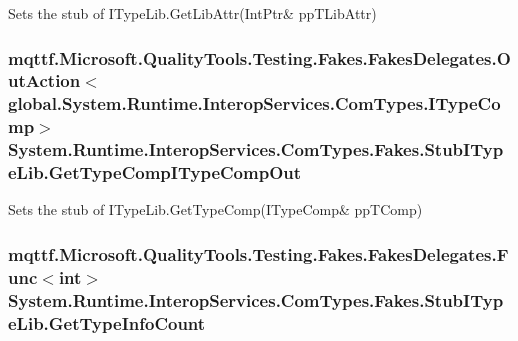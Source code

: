 Sets the stub of I\-Type\-Lib.\-Get\-Lib\-Attr(Int\-Ptr\& pp\-T\-Lib\-Attr)

\hypertarget{class_system_1_1_runtime_1_1_interop_services_1_1_com_types_1_1_fakes_1_1_stub_i_type_lib_a42087c469d29f62864aa523aad99c46e}{
\subsubsection[{Get\-Type\-Comp\-I\-Type\-Comp\-Out}]{\setlength{\rightskip}{0pt plus 5cm}mqttf.\-Microsoft.\-Quality\-Tools.\-Testing.\-Fakes.\-Fakes\-Delegates.\-Out\-Action$<$global.\-System.\-Runtime.\-Interop\-Services.\-Com\-Types.\-I\-Type\-Comp$>$ System.\-Runtime.\-Interop\-Services.\-Com\-Types.\-Fakes.\-Stub\-I\-Type\-Lib.\-Get\-Type\-Comp\-I\-Type\-Comp\-Out}}\label{class_system_1_1_runtime_1_1_interop_services_1_1_com_types_1_1_fakes_1_1_stub_i_type_lib_a42087c469d29f62864aa523aad99c46e}


Sets the stub of I\-Type\-Lib.\-Get\-Type\-Comp(I\-Type\-Comp\& pp\-T\-Comp)

\hypertarget{class_system_1_1_runtime_1_1_interop_services_1_1_com_types_1_1_fakes_1_1_stub_i_type_lib_abb1a9b57dcd91bf558ec32f6e2cf8f4f}{
\subsubsection[{Get\-Type\-Info\-Count}]{\setlength{\rightskip}{0pt plus 5cm}mqttf.\-Microsoft.\-Quality\-Tools.\-Testing.\-Fakes.\-Fakes\-Delegates.\-Func$<$int$>$ System.\-Runtime.\-Interop\-Services.\-Com\-Types.\-Fakes.\-Stub\-I\-Type\-Lib.\-Get\-Type\-Info\-Count}}\label{class_system_1_1_runtime_1_1_interop_services_1_1_com_types_1_1_fakes_1_1_stub_i_type_lib_abb1a9b57dcd91bf558ec32f6e2cf8f4f}


